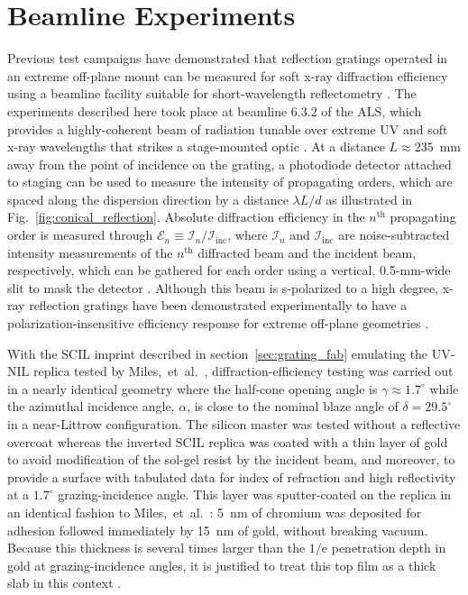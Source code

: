 \documentclass{osa-article}
\begin{document}
\section{Beamline Experiments}\label{sec:beamline_testing}
Previous test campaigns have demonstrated that reflection gratings operated in an extreme off-plane mount can be measured for soft x-ray diffraction efficiency using a beamline facility suitable for short-wavelength reflectometry \cite{Tutt16,Marlowe16,Miles18,McCoy20}. 
The experiments described here took place at beamline 6.3.2 of the ALS, which provides a highly-coherent beam of radiation tunable over extreme UV and soft x-ray wavelengths that strikes a stage-mounted optic \cite{als632,Underwood96,Gullikson01}. 
At a distance $L \approx 235$~mm away from the point of incidence on the grating, a photodiode detector attached to staging can be used to measure the intensity of propagating orders, which are spaced along the dispersion direction by a distance $\lambda L / d$ as illustrated in Fig.~\ref{fig:conical_reflection}. 
Absolute diffraction efficiency in the $n^{\text{th}}$ propagating order is measured through $\mathcal{E}_n \equiv \mathcal{I}_n / \mathcal{I}_{\text{inc}}$, where $\mathcal{I}_n$ and $\mathcal{I}_{\text{inc}}$ are noise-subtracted intensity measurements of the $n^{\text{th}}$ diffracted beam and the incident beam, respectively, which can be gathered for each order using a vertical, 0.5-mm-wide slit to mask the detector \cite{Miles18,McCoy20}. 
Although this beam is s-polarized to a high degree, x-ray reflection gratings have been demonstrated experimentally to have a polarization-insensitive efficiency response for extreme off-plane geometries \cite{Marlowe16}. 

With the SCIL imprint described in section~\ref{sec:grating_fab} emulating the UV-NIL replica tested by Miles,~et~al.~\cite{Miles18}, diffraction-efficiency testing was carried out in a nearly identical geometry where the half-cone opening angle is $\gamma \approx 1.7^{\circ}$ while the azimuthal incidence angle, $\alpha$, is close to the nominal blaze angle of $\delta = 29.5^{\circ}$ in a near-Littrow configuration. 
The silicon master was tested without a reflective overcoat whereas the inverted SCIL replica was coated with a thin layer of gold to avoid modification of the sol-gel resist by the incident beam, and moreover, to provide a surface with tabulated data for index of refraction and high reflectivity at a $1.7^{\circ}$ grazing-incidence angle. 
This layer was sputter-coated on the replica in an identical fashion to Miles,~et~al.~\cite{Miles18}: 5~nm of chromium was deposited for adhesion followed immediately by 15~nm of gold, without breaking vacuum. 
Because this thickness is several times larger than the $1/\mathrm{e}$ penetration depth in gold at grazing-incidence angles, it is justified to treat this top film as a thick slab in this context \cite{Attwood17,McCoy20}. 
\end{document}
